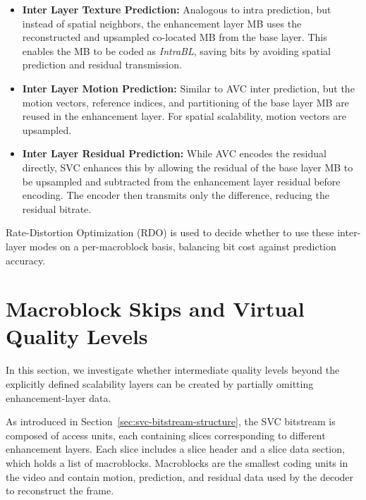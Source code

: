     \begin{itemize}
        \item 
            \textbf{Inter Layer Texture Prediction:} 
            Analogous to intra prediction, but instead of spatial neighbors, the
            enhancement layer MB uses the reconstructed and upsampled co-located
            MB from the base layer. This enables the MB to be coded as
            \textit{IntraBL}, saving bits by avoiding spatial prediction and
            residual transmission.

        \item 
            \textbf{Inter Layer Motion Prediction:} 
            Similar to AVC inter prediction, but the motion vectors, reference
            indices, and partitioning of the base layer MB are reused in the
            enhancement layer. For spatial scalability, motion vectors
            are upsampled.

        \item 
            \textbf{Inter Layer Residual Prediction:} 
            While AVC encodes the residual directly, SVC enhances this by
            allowing the residual of the base layer MB to be upsampled and
            subtracted from the enhancement layer residual before encoding. The
            encoder then transmits only the difference, reducing the residual
            bitrate.

    \end{itemize}

    Rate-Distortion Optimization (RDO) is used to decide whether to use these
    inter-layer modes on a per-macroblock basis, balancing bit cost against
    prediction accuracy.


\section{Macroblock Skips and Virtual Quality Levels}
\label{sec:virtual-quality-levels}
    In this section, we investigate whether intermediate quality levels beyond
    the explicitly defined scalability layers can be created by partially
    omitting enhancement-layer data.

    As introduced in Section~\ref{sec:svc-bitstream-structure}, the SVC
    bitstream is composed of access units, each containing slices corresponding
    to different enhancement layers. Each slice includes a slice header and a
    slice data section, which holds a list of macroblocks. Macroblocks are the
    smallest coding units in the video and contain motion, prediction, and
    residual data used by the decoder to reconstruct the frame.

